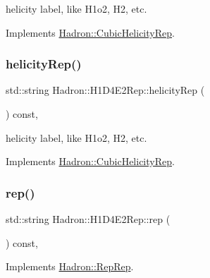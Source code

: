 helicity label, like H1o2, H2, etc. 

Implements \mbox{\hyperlink{structHadron_1_1CubicHelicityRep_af1096946b7470edf0a55451cc662f231}{Hadron\+::\+Cubic\+Helicity\+Rep}}.

\mbox{\label{structHadron_1_1H1D4E2Rep_a2c58d7ff3d9ef7f2adedc4e0a12db6cb}} 
\subsubsection{\texorpdfstring{helicityRep()}{helicityRep()}\hspace{0.1cm}{\footnotesize\ttfamily [3/3]}}
{\footnotesize\ttfamily std\+::string Hadron\+::\+H1\+D4\+E2\+Rep\+::helicity\+Rep (\begin{DoxyParamCaption}{ }\end{DoxyParamCaption}) const\hspace{0.3cm}{\ttfamily [inline]}, {\ttfamily [virtual]}}

helicity label, like H1o2, H2, etc. 

Implements \mbox{\hyperlink{structHadron_1_1CubicHelicityRep_af1096946b7470edf0a55451cc662f231}{Hadron\+::\+Cubic\+Helicity\+Rep}}.

\mbox{\label{structHadron_1_1H1D4E2Rep_a21042b3f507f32a467b776db77aa093f}} 
\subsubsection{\texorpdfstring{rep()}{rep()}\hspace{0.1cm}{\footnotesize\ttfamily [1/5]}}
{\footnotesize\ttfamily std\+::string Hadron\+::\+H1\+D4\+E2\+Rep\+::rep (\begin{DoxyParamCaption}{ }\end{DoxyParamCaption}) const\hspace{0.3cm}{\ttfamily [inline]}, {\ttfamily [virtual]}}



Implements \mbox{\hyperlink{structHadron_1_1RepRep_ab3213025f6de249f7095892109575fde}{Hadron\+::\+Rep\+Rep}}.

\mbox{\label{structHadron_1_1H1D4E2Rep_a21042b3f507f32a467b776db77aa093f}} 
